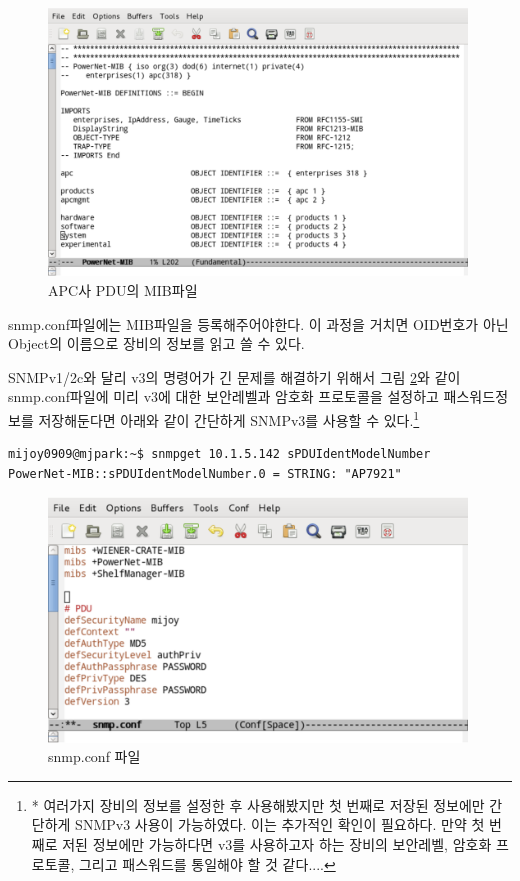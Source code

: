 \documentclass[11pt
  , a4paper
  , article
  , oneside
]{memoir}
\begin{document}
\begin{figure}[h]
  \centering
  \includegraphics[width=0.99\textwidth]{./images/pdu_mib.eps}
  \caption{APC사 PDU의 MIB파일}
  \label{fig:pdu_mib}   
\end{figure}


\clearpage

snmp.conf파일에는 MIB파일을 등록해주어야한다. 이 과정을 거치면 OID번호가 아닌 Object의 이름으로 장비의 정보를 읽고 쓸 수 있다. 

SNMPv1/2c와 달리 v3의 명령어가 긴 문제를 해결하기 위해서 그림 \ref{fig:snmp_conf}와 같이 snmp.conf파일에 미리 v3에 대한 보안레벨과 암호화 프로토콜을 설정하고 패스워드정보를 저장해둔다면 아래와 같이 간단하게 SNMPv3를 사용할 수 있다.\footnote{* 여러가지 장비의 정보를 설정한 후 사용해봤지만 첫 번째로 저장된 정보에만 간단하게 SNMPv3 사용이 가능하였다. 이는 추가적인 확인이 필요하다. 만약 첫 번째로 저된 정보에만 가능하다면 v3를 사용하고자 하는 장비의 보안레벨, 암호화 프로토콜, 그리고 패스워드를 통일해야 할 것 같다....}

\begin{lstlisting}[style=termstyle]
mijoy0909@mjpark:~$ snmpget 10.1.5.142 sPDUIdentModelNumber
PowerNet-MIB::sPDUIdentModelNumber.0 = STRING: "AP7921"
\end{lstlisting}


\begin{figure}[h]
  \centering
  \includegraphics[width=0.99\textwidth]{./images/snmp_conf.eps}
  \caption{snmp.conf 파일}
  \label{fig:snmp_conf}   
\end{figure}
\end{document}
